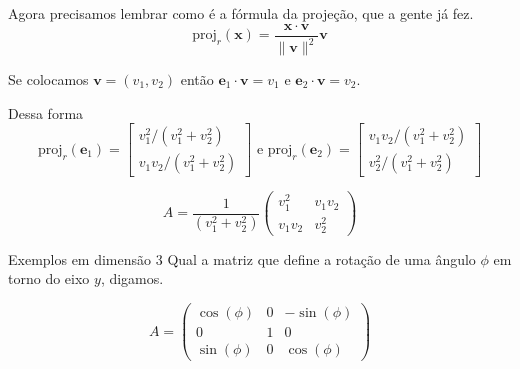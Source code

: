 \documentclass{beamer}
\begin{document}
\begin{frame}
  Agora precisamos lembrar como é a fórmula da projeção, que a gente já fez.
  $$ \text{proj}_{r}(\mathbf{x}) = \frac{\mathbf{x}\cdot\mathbf{v}}{\|\mathbf{v}\|^2}\mathbf{v}$$

  Se colocamos $\mathbf{v}=(v_1,v_2)$ então $\mathbf{e}_1 \cdot \mathbf{v} = v_1$ e  $\mathbf{e}_2 \cdot \mathbf{v} = v_2.$ 
 
  Dessa forma
    $$
    \text{proj}_{r}(\mathbf{e}_1) =
    \begin{bmatrix}
  v_1^2/(v_1^2 + v_2^2) \\ v_1v_2 / (v_1^2 + v_2^2)
\end{bmatrix} \text{ e }\text{proj}_{r}(\mathbf{e}_2) =
\begin{bmatrix}
v_1 v_2/(v_1^2 + v_2^2) \\ v_2^2 / (v_1^2 + v_2^2)
\end{bmatrix} 
$$

$$ A = \frac{1}{(v_1^2+v_2^2)}\begin{pmatrix}
  v_1^2 & v_1v_2 \\ v_1v_2 & v_2^2
\end{pmatrix}
$$
\end{frame}

\begin{frame}{Exemplos em dimensão 3}
  Qual a matriz que define a rotação de uma ângulo $\phi$ em torno do 
  eixo $y$, digamos.
\begin{center}
\end{center}
$$ A= \begin{pmatrix}
  \cos(\phi) & 0 & -\sin(\phi)\\
  0 & 1 & 0 \\
  \sin(\phi) & 0 &\cos(\phi)
\end{pmatrix}$$
\end{frame}
\end{document}
